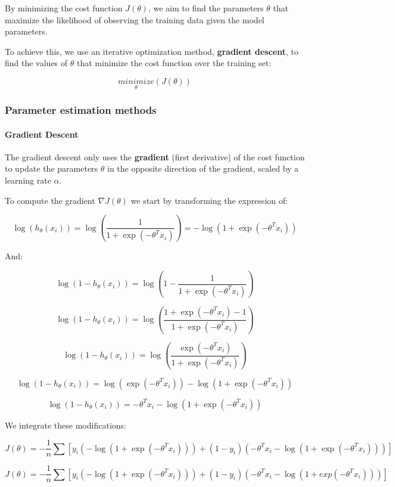 \documentclass{article}
\begin{document}
By minimizing the cost function \(J(\theta)\), we aim to find the
parameters \(\theta\) that maximize the likelihood of observing the
training data given the model parameters.

To achieve this, we use an iterative optimization method,
\textbf{gradient descent}, to find the values of \(\theta\) that
minimize the cost function over the training set:

\[\underset{\theta}{minimize}(J(\theta))\]

\subsubsection{Parameter estimation
methods}\label{parameter-estimation-methods}

\paragraph{Gradient Descent}\label{gradient-descent}

The gradient descent only uses the \textbf{gradient} (first derivative)
of the cost function to update the parameters \(\theta\) in the opposite
direction of the gradient, scaled by a learning rate \(\alpha\).

To compute the gradient \(\nabla J(\theta)\) we start by transforming
the expression of:

\[\log(h_\theta(x_i)) = \log\left(\frac{1}{1 + \exp(-\theta^Tx_i)}\right) = -\log(1 + \exp(-\theta^Tx_i))\]

And:

\[\log(1 - h_\theta(x_i)) = \log\left(1 - \frac{1}{1 + \exp(-\theta^Tx_i)}\right)\]

\[\log(1 - h_\theta(x_i)) = \log\left(\frac{1 + \exp(-\theta^Tx_i) - 1}{1 + \exp(-\theta^Tx_i)}\right)\]

\[\log(1 - h_\theta(x_i)) = \log\left(\frac{\exp(-\theta^Tx_i)}{1 + \exp(-\theta^Tx_i)}\right)\]

\[\log(1 - h_\theta(x_i)) = \log(\exp(-\theta^Tx_i)) - \log({1 + \exp(-\theta^Tx_i)})\]

\[\log(1 - h_\theta(x_i)) = -\theta^Tx_i - \log({1 + \exp(-\theta^Tx_i)})\]

We integrate these modifications:

\[J(\theta) = -\frac{1}{n} \sum[y_i (-\log(1 + \exp(-\theta^Tx_i))) + (1 - y_i) (-\theta^Tx_i - \log({1 + \exp(-\theta^Tx_i)}))]\]

\[J(\theta) = -\frac{1}{n} \sum[y_i (-\log(1 + \exp(-\theta^Tx_i))) + (1 - y_i) (-\theta^Tx_i - \log(1 + exp(-\theta^Tx_i)))]\]
\end{document}
